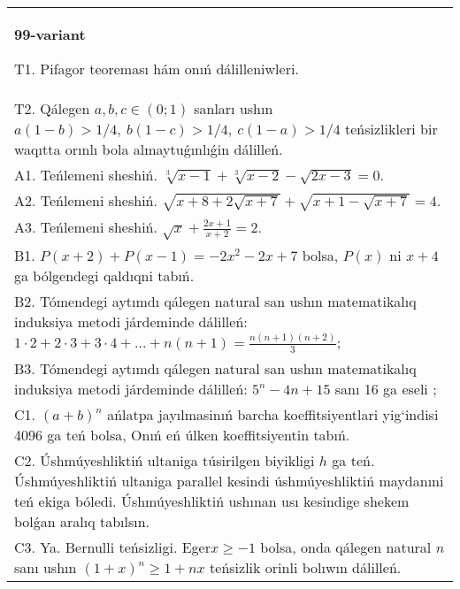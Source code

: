\documentclass{article}
\begin{document}
\begin{tabular}{m{17cm}}
\textbf{99-variant}
\newline

T1. Pifagor teoreması hám onıń dálilleniwleri. \\
T2. Qálegen \(a,b,c \in (0;1)\) sanları ushın \(a(1 - b) > 1/4,\ b(1 - c) > 1/4,\ c(1 - a) > 1/4\) teńsizlikleri bir waqıtta orınlı bola almaytuǵınlıǵin dálilleń. \\
A1. Teńlemeni sheshiń. \(\sqrt[3]{x - 1} + \sqrt[3]{x - 2} - \sqrt{2x - 3} = 0\). \\
A2. Teńlemeni sheshiń. \(\sqrt{x + 8 + 2\sqrt{x + 7}} + \sqrt{x + 1 - \sqrt{x + 7}} = 4\). \\
A3. Teńlemeni sheshiń. \(\sqrt{x} + \frac{2x + 1}{x + 2} = 2\). \\
B1. \(P(x + 2) + P(x - 1) = - 2x^{2} - 2x + 7\) bolsa, \(P(x)\) ni \(x + 4\) ga bólgendegi qaldıqni tabıń. \\
B2. Tómendegi aytımdı qálegen natural san ushın matematikalıq induksiya metodi járdeminde dálilleń: \(1 \cdot 2 + 2 \cdot 3 + 3 \cdot 4 + ... + n(n + 1) = \frac{n(n + 1)(n + 2)}{3}\); \\
B3. Tómendegi aytımdı qálegen natural san ushın matematikalıq induksiya metodi járdeminde dálilleń: \(5^{n} - 4n + 15\) sanı 16 ga eseli ; \\
C1. \((a + b)^{n}\) ańlatpa jayılmasinıń barcha koeffitsiyentlari yig`indisi 4096 ga teń bolsa, Onıń eń úlken koeffitsiyentin tabıń. \\
C2. Úshmúyeshliktiń ultaniga túsirilgen biyikligi \(h\) ga teń. Úshmúyeshliktiń ultaniga parallel kesindi úshmúyeshliktiń maydanıni teń ekiga bóledi. Úshmúyeshliktiń ushınan usı kesindige shekem bolǵan aralıq tabılsın. \\
C3. Ya. Bernulli teńsizligi. Eger\(x \geq - 1\) bolsa, onda qálegen natural \(n\) sanı ushın \((1 + x)^{n} \geq 1 + nx\) teńsizlik orinli bolıwın dálilleń. \\

\end{tabular}
\vspace{1cm}
\end{document}
